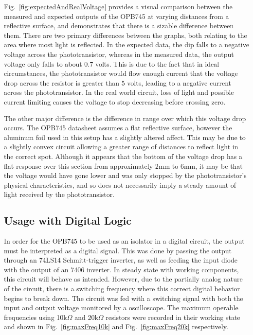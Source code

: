 \documentclass[conference]{IEEEtran}
\begin{document}
Fig.~\ref{fig:expectedAndRealVoltage} provides a visual comparison between the measured and expected
outputs of the OPB745 at varying distances from a reflective surface, and demonstrates that there is
a sizable difference between them. There are two primary differences between the graphs, both relating to
the area where most light is reflected. In the expected data, the dip falls to a negative voltage across
the phototransistor, whereas in the measured data, the output voltage only falls to about 0.7 volts. This is
due to the fact that in ideal circumstances, the phototransistor would flow enough current that the voltage
drop across the resistor is greater than 5 volts, leading to a negative current across the phototransistor.
In the real world circuit, loss of light and possible current limiting causes the voltage to stop decreasing before
crossing zero.

The other major difference is the difference in range over which this voltage drop occurs. The OPB745 datasheet
assumes a flat reflective surface, however the aluminum foil used in this setup has a slightly altered affect.
This may be due to a slightly convex circuit allowing a greater range of distances to reflect light in the
correct spot. Although it appears that the bottom of the voltage drop has a flat response over this section
from approximately 2mm to 6mm, it may be that the voltage would have gone lower and was only stopped by
the phototransistor's physical characteristics, and so does not necessarily imply a steady amount of light
received by the phototransistor.

\subsection{Usage with Digital Logic}

In order for the OPB745 to be used as an isolator in a digital
circuit, the output must be interpreted as a digital signal.
This was done by passing the output through an 74LS14 
Schmitt-trigger inverter, as
well as feeding the input diode with the output of an 7406
inverter. In steady state with working components, this circuit
will behave as intended. However, due to the partially analog
nature of the circuit, there is a switching frequency where
this correct digital behavior begins to break down. The circuit
was fed with a switching signal with both the input and output voltage
monitored by a oscilloscope. The maximum operable frequencies using
10k$\Omega$ and 20k$\Omega$ resistors were
recorded in their working state and shown in Fig.~\ref{fig:maxFreq10k} and Fig.~\ref{fig:maxFreq20k} respectively.
\end{document}
